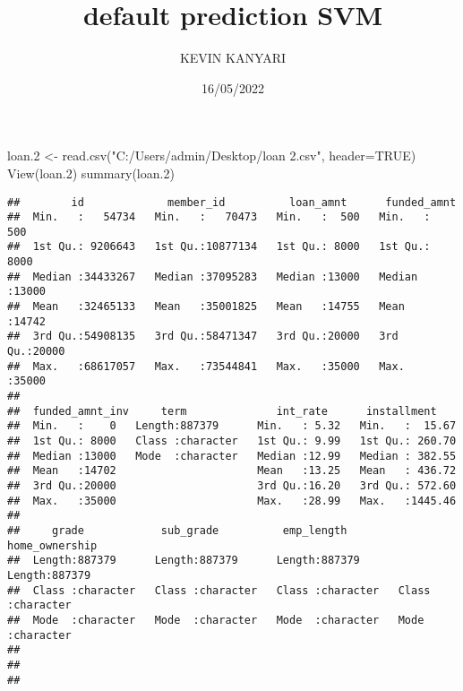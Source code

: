 \documentclass[
]{article}
\title{default prediction SVM}
\author{KEVIN KANYARI}
\date{16/05/2022}
\newenvironment{Shaded}{\begin{snugshade}}{\end{snugshade}}
\newcommand{\AttributeTok}[1]{\textcolor[rgb]{0.77,0.63,0.00}{#1}}
\newcommand{\ConstantTok}[1]{\textcolor[rgb]{0.00,0.00,0.00}{#1}}
\newcommand{\FloatTok}[1]{\textcolor[rgb]{0.00,0.00,0.81}{#1}}
\newcommand{\FunctionTok}[1]{\textcolor[rgb]{0.00,0.00,0.00}{#1}}
\newcommand{\NormalTok}[1]{#1}
\newcommand{\OtherTok}[1]{\textcolor[rgb]{0.56,0.35,0.01}{#1}}
\newcommand{\StringTok}[1]{\textcolor[rgb]{0.31,0.60,0.02}{#1}}
\begin{document}
\maketitle

\begin{Shaded}
\begin{Highlighting}[]
\NormalTok{loan}\FloatTok{.2} \OtherTok{\textless{}{-}} \FunctionTok{read.csv}\NormalTok{(}\StringTok{"C:/Users/admin/Desktop/loan 2.csv"}\NormalTok{, }\AttributeTok{header=}\ConstantTok{TRUE}\NormalTok{)}
\FunctionTok{View}\NormalTok{(loan}\FloatTok{.2}\NormalTok{)}
\FunctionTok{summary}\NormalTok{(loan}\FloatTok{.2}\NormalTok{)}
\end{Highlighting}
\end{Shaded}

\begin{verbatim}
##        id             member_id          loan_amnt      funded_amnt   
##  Min.   :   54734   Min.   :   70473   Min.   :  500   Min.   :  500  
##  1st Qu.: 9206643   1st Qu.:10877134   1st Qu.: 8000   1st Qu.: 8000  
##  Median :34433267   Median :37095283   Median :13000   Median :13000  
##  Mean   :32465133   Mean   :35001825   Mean   :14755   Mean   :14742  
##  3rd Qu.:54908135   3rd Qu.:58471347   3rd Qu.:20000   3rd Qu.:20000  
##  Max.   :68617057   Max.   :73544841   Max.   :35000   Max.   :35000  
##                                                                       
##  funded_amnt_inv     term              int_rate      installment     
##  Min.   :    0   Length:887379      Min.   : 5.32   Min.   :  15.67  
##  1st Qu.: 8000   Class :character   1st Qu.: 9.99   1st Qu.: 260.70  
##  Median :13000   Mode  :character   Median :12.99   Median : 382.55  
##  Mean   :14702                      Mean   :13.25   Mean   : 436.72  
##  3rd Qu.:20000                      3rd Qu.:16.20   3rd Qu.: 572.60  
##  Max.   :35000                      Max.   :28.99   Max.   :1445.46  
##                                                                      
##     grade            sub_grade          emp_length        home_ownership    
##  Length:887379      Length:887379      Length:887379      Length:887379     
##  Class :character   Class :character   Class :character   Class :character  
##  Mode  :character   Mode  :character   Mode  :character   Mode  :character  
##                                                                             
##                                                                             
##                                                                             

\end{verbatim}
\end{document}
